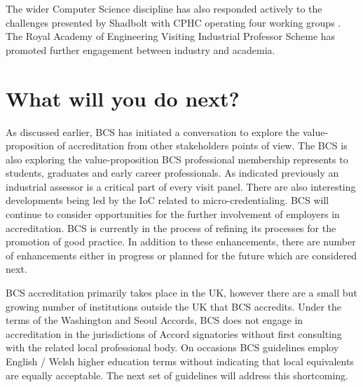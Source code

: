 \documentclass[sigconf]{acmart}
\begin{document}
The wider Computer Science discipline has also responded actively to the challenges presented by Shadbolt with CPHC operating four working groups \cite{cphc_2016}.  The Royal Academy of Engineering Visiting Industrial Professor Scheme \cite{royal} has promoted further engagement between industry and academia.

\section {What will you do next?}	
As discussed earlier, BCS has initiated a conversation to explore the
value-proposition of accreditation from other stakeholders points of
view. The BCS is also exploring the value-proposition BCS professional
membership
represents to students, graduates and early career professionals. As
indicated previously an industrial assessor is a critical part of
every visit panel. There are also interesting developments being led
by the IoC related to micro-credentialing. BCS will continue to
consider opportunities for the further involvement of employers in
accreditation. BCS is currently in the process of refining its
processes for the promotion of good practice. In addition to these
enhancements, there are number of enhancements either in progress or
planned for the future which are considered next.

BCS accreditation primarily takes place in the UK, however there are a small but growing number of institutions outside the UK that BCS accredits. Under the terms of the Washington and Seoul Accords, BCS does not engage in accreditation in the jurisdictions of Accord signatories without first consulting with the related local professional body.  On occasions BCS guidelines employ English / Welsh higher education terms without indicating that local equivalents are equally acceptable. The next set of guidelines will address this shortcoming.
\end{document}
